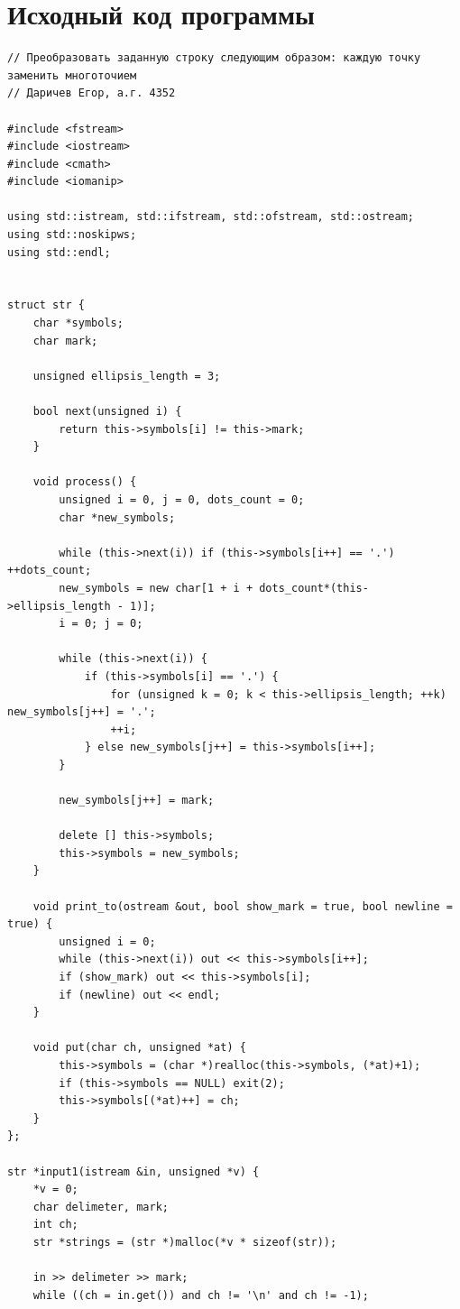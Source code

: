 \documentclass[12pt,a4paper]{extarticle}
\begin{document}
\section{Исходный код программы}
{\ttfamily\scriptsize
\begin{verbatim}
// Преобразовать заданную строку следующим образом: каждую точку заменить многоточием
// Даричев Егор, а.г. 4352

#include <fstream>
#include <iostream>
#include <cmath>
#include <iomanip>

using std::istream, std::ifstream, std::ofstream, std::ostream;
using std::noskipws;
using std::endl;


struct str {
    char *symbols;
    char mark;

    unsigned ellipsis_length = 3;

    bool next(unsigned i) {
        return this->symbols[i] != this->mark;
    }

    void process() {
        unsigned i = 0, j = 0, dots_count = 0;
        char *new_symbols;

        while (this->next(i)) if (this->symbols[i++] == '.') ++dots_count;
        new_symbols = new char[1 + i + dots_count*(this->ellipsis_length - 1)];
        i = 0; j = 0;

        while (this->next(i)) {
            if (this->symbols[i] == '.') {
                for (unsigned k = 0; k < this->ellipsis_length; ++k) new_symbols[j++] = '.';
                ++i;
            } else new_symbols[j++] = this->symbols[i++];
        }

        new_symbols[j++] = mark;

        delete [] this->symbols;
        this->symbols = new_symbols;
    }

    void print_to(ostream &out, bool show_mark = true, bool newline = true) {
        unsigned i = 0;
        while (this->next(i)) out << this->symbols[i++];
        if (show_mark) out << this->symbols[i];
        if (newline) out << endl;
    }

    void put(char ch, unsigned *at) {
        this->symbols = (char *)realloc(this->symbols, (*at)+1);
        if (this->symbols == NULL) exit(2);
        this->symbols[(*at)++] = ch;
    }
};

str *input1(istream &in, unsigned *v) {
    *v = 0;
    char delimeter, mark;
    int ch;
    str *strings = (str *)malloc(*v * sizeof(str));

    in >> delimeter >> mark;
    while ((ch = in.get()) and ch != '\n' and ch != -1);


\end{verbatim}}
\end{document}
